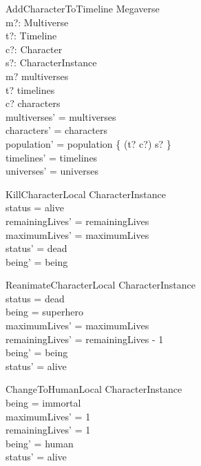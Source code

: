\documentclass{article}
\begin{document}
\begin{schema}{AddCharacterToTimeline}
\Delta Megaverse \\
m?: Multiverse \\
t?: Timeline \\
c?: Character \\
s?: CharacterInstance \\ 
\where
m? \in multiverses \\
t? \in timelines \\ 
c? \in characters \\
multiverses' = multiverses \\
characters' = characters \\
population' = population \cup \{ (t? \mapsto c?) \mapsto s? \} \\ 
timelines' = timelines \\
universes' = universes \\
\end{schema}

\begin{schema}{KillCharacterLocal} 
\Delta CharacterInstance \\
\where
status = alive \\
remainingLives' = remainingLives \\
maximumLives' = maximumLives \\
status' = dead \\
being' = being \\
\end{schema}

\begin{schema}{ReanimateCharacterLocal}
\Delta CharacterInstance \\
\where
status = dead \\
being = superhero \\
maximumLives' = maximumLives \\
remainingLives' = remainingLives - 1 \\
being' = being \\
status' = alive \\
\end{schema}

\begin{schema}{ChangeToHumanLocal}
\Delta CharacterInstance \\
\where
being = immortal \\
maximumLives' = 1 \\
remainingLives' = 1 \\
being' = human \\
status' = alive \\
\end{schema}
\end{document}
